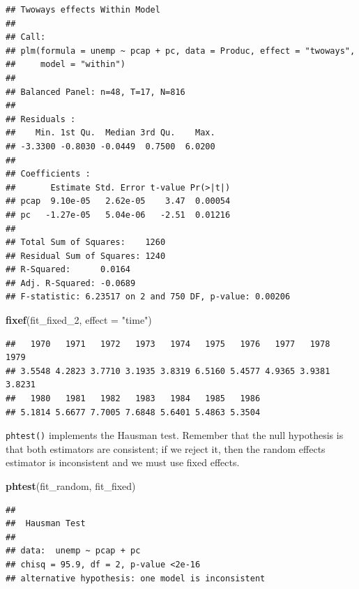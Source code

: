 \documentclass[12pt,oneside,openany]{book}
\newenvironment{Shaded}{\begin{snugshade}}{\end{snugshade}}
\newcommand{\KeywordTok}[1]{\textcolor[rgb]{0.13,0.29,0.53}{\textbf{#1}}}
\newcommand{\DataTypeTok}[1]{\textcolor[rgb]{0.13,0.29,0.53}{#1}}
\newcommand{\DecValTok}[1]{\textcolor[rgb]{0.00,0.00,0.81}{#1}}
\newcommand{\StringTok}[1]{\textcolor[rgb]{0.31,0.60,0.02}{#1}}
\newcommand{\NormalTok}[1]{#1}
\begin{document}
\begin{verbatim}
## Twoways effects Within Model
## 
## Call:
## plm(formula = unemp ~ pcap + pc, data = Produc, effect = "twoways", 
##     model = "within")
## 
## Balanced Panel: n=48, T=17, N=816
## 
## Residuals :
##    Min. 1st Qu.  Median 3rd Qu.    Max. 
## -3.3300 -0.8030 -0.0449  0.7500  6.0200 
## 
## Coefficients :
##       Estimate Std. Error t-value Pr(>|t|)
## pcap  9.10e-05   2.62e-05    3.47  0.00054
## pc   -1.27e-05   5.04e-06   -2.51  0.01216
## 
## Total Sum of Squares:    1260
## Residual Sum of Squares: 1240
## R-Squared:      0.0164
## Adj. R-Squared: -0.0689
## F-statistic: 6.23517 on 2 and 750 DF, p-value: 0.00206
\end{verbatim}

\begin{Shaded}
\begin{Highlighting}[]
\KeywordTok{fixef}\NormalTok{(fit_fixed_}\DecValTok{2}\NormalTok{, }\DataTypeTok{effect =} \StringTok{"time"}\NormalTok{)}
\end{Highlighting}
\end{Shaded}

\begin{verbatim}
##   1970   1971   1972   1973   1974   1975   1976   1977   1978   1979 
## 3.5548 4.2823 3.7710 3.1935 3.8319 6.5160 5.4577 4.9365 3.9381 3.8231 
##   1980   1981   1982   1983   1984   1985   1986 
## 5.1814 5.6677 7.7005 7.6848 5.6401 5.4863 5.3504
\end{verbatim}

\texttt{phtest()} implements the Hausman test. Remember that the null
hypothesis is that both estimators are consistent; if we reject it, then
the random effects estimator is inconsistent and we must use fixed
effects.

\begin{Shaded}
\begin{Highlighting}[]
\KeywordTok{phtest}\NormalTok{(fit_random, fit_fixed)}
\end{Highlighting}
\end{Shaded}

\begin{verbatim}
## 
##  Hausman Test
## 
## data:  unemp ~ pcap + pc
## chisq = 95.9, df = 2, p-value <2e-16
## alternative hypothesis: one model is inconsistent
\end{verbatim}


\end{document}
